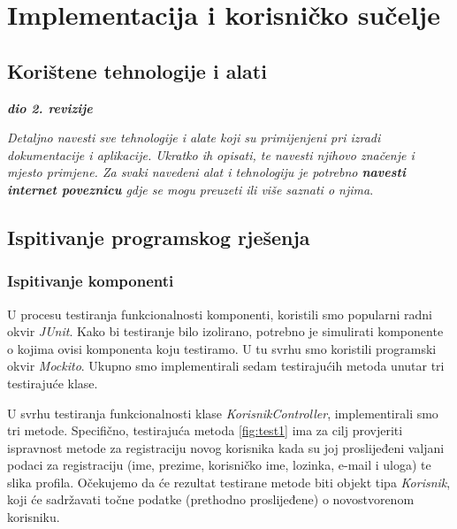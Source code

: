 \chapter{Implementacija i korisničko sučelje}


\section{Korištene tehnologije i alati}

\textbf{\textit{dio 2. revizije}}

\textit{Detaljno navesti sve tehnologije i alate koji su primijenjeni pri izradi dokumentacije i aplikacije. Ukratko ih opisati, te navesti njihovo značenje i mjesto primjene. Za svaki navedeni alat i tehnologiju je potrebno \textbf{navesti internet poveznicu} gdje se mogu preuzeti ili više saznati o njima}.


\eject


\section{Ispitivanje programskog rješenja}




\subsection{Ispitivanje komponenti}
U procesu testiranja funkcionalnosti komponenti,  koristili smo popularni radni okvir \textit{JUnit}. Kako bi testiranje bilo izolirano, potrebno je simulirati komponente o kojima ovisi komponenta koju testiramo. U tu svrhu smo koristili programski okvir \textit{Mockito}. Ukupno smo implementirali sedam testirajućih metoda unutar tri testirajuće klase.

\vspace{1em}

U svrhu testiranja funkcionalnosti klase \textit{KorisnikController}, implementirali smo tri metode. Specifično, testirajuća metoda \ref{fig:test1} ima za cilj provjeriti ispravnost metode za registraciju novog korisnika kada su joj proslijeđeni valjani podaci za registraciju (ime, prezime, korisničko ime, lozinka, e-mail i uloga) te slika profila. Očekujemo da će rezultat testirane metode biti objekt tipa \textit{Korisnik}, koji će sadržavati točne podatke (prethodno proslijeđene) o novostvorenom korisniku.

